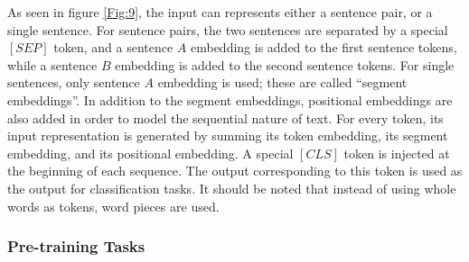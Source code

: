 As seen in figure \ref{Fig:9}, the input can represents either a sentence pair, or a single sentence. For sentence pairs, the two sentences are separated by a special $[SEP]$ token, and a sentence $A$ embedding is added to the first sentence tokens, while a sentence $B$ embedding is added to the second sentence tokens. For single sentences, only sentence $A$ embedding is used; these are called \enquote{segment embeddings}. In addition to the segment embeddings, positional embeddings \cite{gehring2017convolutional} are also added in order to model the sequential nature of text. For every token, its input representation is generated by summing its token embedding, its segment embedding, and its positional embedding. A special $[CLS]$ token is injected at the beginning of each sequence. The output corresponding to this token is used as the output for classification tasks. It should be noted that instead of using whole words as tokens, word pieces \cite{wu2016google} are used.




\subsubsection{Pre-training Tasks}


